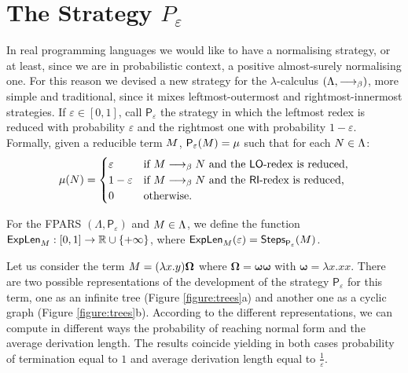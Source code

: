 \section{The Strategy $P_\varepsilon$}
In real programming languages we would like to have a normalising strategy, or at least, since we are in probabilistic context, a positive almost-surely normalising one. For this reason we devised a new strategy for the $\lambda$-calculus $(\Lambda,\longrightarrow_\beta)$, more simple and traditional, since it mixes leftmost-outermost and rightmost-innermost strategies. If $\varepsilon\in[0,1]$, call $\mathsf{P}_\varepsilon$ the strategy in which the leftmost redex is reduced with probability $\varepsilon$ and the rightmost one with probability $1-\varepsilon$. Formally, given a reducible term $M$, $\mathsf{P}_\varepsilon(M)=\mu$ such that for each $N\in\Lambda$:
$$
\mu(N)=\begin{cases}
\varepsilon & \text{if }M\longrightarrow_\beta N\text{ and the }\textsf{LO}\text{-redex is reduced,}\\
1-\varepsilon & \text{if }M\longrightarrow_\beta N\text{ and the }\textsf{RI}\text{-redex is reduced,}\\
0 & \text{otherwise}.\\
\end{cases}
$$
\begin{notation}
	For the FPARS $(\Lambda,\mathsf{P}_\varepsilon)$ and $M\in\Lambda$, we define the function $\textsf{ExpLen}_{M}:[0,1]\rightarrow\mathbb{R}\cup\{+\infty\}$, where
	$\textsf{ExpLen}_{M}(\varepsilon)=\textsf{Steps}_{\mathsf{P}_\varepsilon}(M)$.
\end{notation}
\begin{example}
	Let us consider the term $M=(\lambda x.y)\bm{\Omega}$ where $\bm{\Omega}=\bm{\omega\omega}$  with $\bm{\omega}=\lambda x.xx$. There are two possible representations of the development of the strategy $\mathsf{P}_\varepsilon$ for this term, one as an infinite tree (Figure \ref{figure:trees}a) and another one as a cyclic graph (Figure \ref{figure:trees}b). According to the different representations, we can compute in different ways the probability of reaching normal form and the average derivation length. The results coincide yielding in both cases probability of termination equal to $1$ and average derivation length equal to $\frac{1}{\varepsilon}$. 
\end{example}
